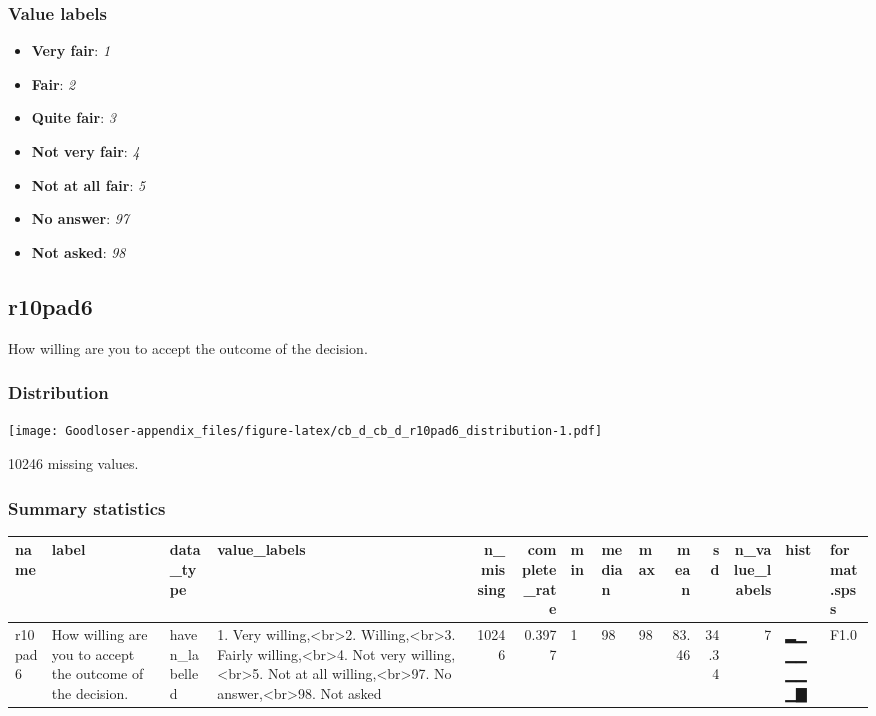 \documentclass[
]{book}
\providecommand{\tightlist}{%
  \setlength{\itemsep}{0pt}\setlength{\parskip}{0pt}}
\begin{document}
\hypertarget{r10pad5_labels}{%
\subsubsection{Value labels}\label{r10pad5_labels}}

\begin{itemize}
\tightlist
\item
  \textbf{Very fair}: \emph{1}
\item
  \textbf{Fair}: \emph{2}
\item
  \textbf{Quite fair}: \emph{3}
\item
  \textbf{Not very fair}: \emph{4}
\item
  \textbf{Not at all fair}: \emph{5}
\item
  \textbf{No answer}: \emph{97}
\item
  \textbf{Not asked}: \emph{98}
\end{itemize}

\hypertarget{r10pad6}{%
\subsection{r10pad6}\label{r10pad6}}

How willing are you to accept the outcome of the decision.

\hypertarget{r10pad6_distribution}{%
\subsubsection{Distribution}\label{r10pad6_distribution}}

\texttt{[image: Goodloser-appendix\_files/figure-latex/cb\_d\_cb\_d\_r10pad6\_distribution-1.pdf]}

10246 missing values.

\hypertarget{r10pad6_summary}{%
\subsubsection{Summary statistics}\label{r10pad6_summary}}

\begin{tabular}{l|l|l|l|r|r|l|l|l|r|r|r|l|l}
\hline
name & label & data_type & value_labels & n_missing & complete_rate & min & median & max & mean & sd & n_value_labels & hist & format.spss\\
\hline
r10pad6 & How willing are you to accept the outcome of the decision. & haven_labelled & 1. Very willing,<br>2. Willing,<br>3. Fairly willing,<br>4. Not very willing,<br>5. Not at all willing,<br>97. No answer,<br>98. Not asked & 10246 & 0.3977 & 1 & 98 & 98 & 83.46 & 34.34 & 7 & ▂▁▁▁▁▁▁▇ & F1.0\\
\hline
\end{tabular}
\end{document}
